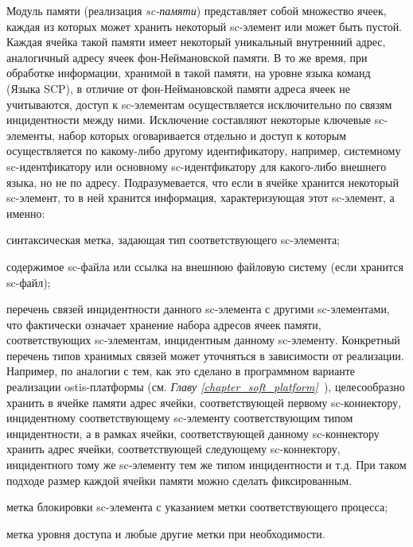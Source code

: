 \begin{textitemize}
	\item Модуль памяти (реализация \textit{sc-памяти}) представляет собой множество ячеек, каждая из которых может хранить некоторый sc-элемент или может быть пустой. Каждая ячейка такой памяти имеет некоторый уникальный внутренний адрес, аналогичный адресу ячеек фон-Неймановской памяти. В то же время, при обработке информации, хранимой в такой памяти, на уровне языка команд (Языка SCP), в отличие от фон-Неймановской памяти адреса ячеек не учитываются, доступ к sc-элементам осуществляется исключительно по связям инцидентности между ними. Исключение составляют некоторые ключевые sc-элементы, набор которых оговаривается отдельно и доступ к которым осуществляется по какому-либо другому идентификатору, например, системному sc-идентфикатору или основному sc-идентфикатору для какого-либо внешнего языка, но не по адресу. 
	Подразумевается, что если в ячейке хранится некоторый sc-элемент, то в ней хранится информация, характеризующая этот sc-элемент, а именно:
	\begin{textitemize}
		\item синтаксическая метка, задающая тип соответствующего sc-элемента;
		\item содержимое sc-файла или ссылка на внешнюю файловую систему (если хранится sc-файл);
		\item перечень связей инцидентности данного sc-элемента с другими sc-элементами, что фактически означает хранение набора адресов ячеек памяти, соответствующих sc-элементам, инцидентным данному sc-элементу. Конкретный перечень типов хранимых связей может уточняться в зависимости от реализации. Например, по аналогии с тем, как это сделано в программном варианте реализации ostis-платформы (см. \textit{Главу \ref{chapter_soft_platform}~}), целесообразно хранить в ячейке памяти адрес ячейки, соответствующей первому sc-коннектору, инцидентному соответствующему sc-элементу соответствующим типом инцидентности, а в рамках ячейки, соответствующей данному sc-коннектору хранить адрес ячейки, соответствующей следующему sc-коннектору, инцидентного тому же sc-элементу тем же типом инцидентности и т.д. При таком подходе размер каждой ячейки памяти можно сделать фиксированным.
		\item метка блокировки sc-элемента с указанием метки соответствующего процесса;
		\item метка уровня доступа и любые другие метки при необходимости.
	\end{textitemize}

\end{textitemize}
